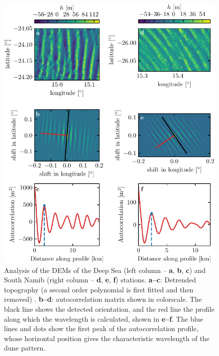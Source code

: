 \begin{figure}
  \centering
  \includegraphics[scale=1]{Figures/Figure4_supp.pdf}
  \caption{Analysis of the DEMs of the Deep Sea (left column -- \textbf{a}, \textbf{b}, \textbf{c}) and South Namib (right column -- \textbf{d}, \textbf{e}, \textbf{f}) stations. \textbf{a--c}: Detrended topography (a second order polynomial is first fitted and then removed) . \textbf{b--d}: autocorrelation matrix shown in colorscale. The black line shows the detected orientation, and the red line the profile along which the wavelength is calculated, shown in \textbf{e--f}. The blue lines and dots show the first peak of the autocorrelation profile, whose horizontal position gives the characteristic wavelength of the dune pattern.}
  \label{Fig4_supp}
\end{figure}

